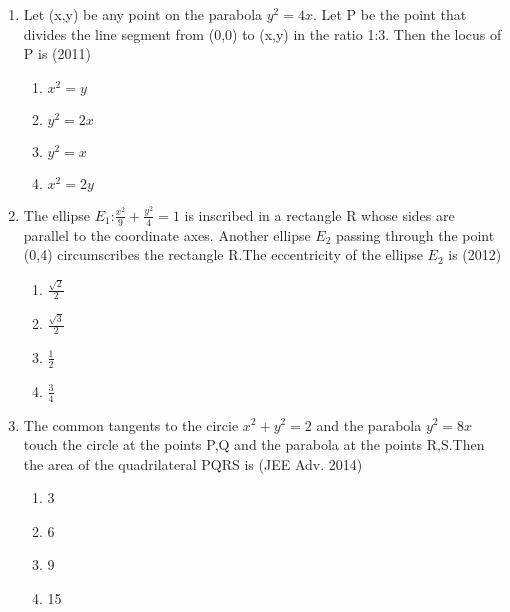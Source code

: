 \documentclass[journal,12pt,onecolumn]{IEEEtran}
\theoremstyle{remark}
\begin{document}
\begin{enumerate}
	\item Let (x,y) be any point on the parabola $y^2=4x$. Let P be the point that divides the line segment from (0,0) to (x,y) in the ratio 1:3. Then the locus of P is  \hfill(2011)\\
		\begin{enumerate}
			\item $x^2=y$
			\item $y^2=2x$
			\item $y^2=x$
			\item $x^2=2y$
		\end{enumerate}

	\item The ellipse $E_{1}$:$\frac{x^2}{9}+\frac{y^2}{4}=1$ is inscribed in a rectangle R whose sides are parallel to the coordinate axes. Another ellipse $E_{2}$ passing through the point (0,4) circumscribes the rectangle R.The eccentricity of the ellipse $E_{2}$ is \hfill(2012)\\

		\begin{enumerate}
			\item $\frac{\sqrt{2}}{2}$
			\item $\frac{\sqrt{3}}{2}$
			\item $\frac{1}{2}$
			\item $\frac{3}{4}$
		\end{enumerate}

	\item The common tangents to the circie $x^2+y^2=2$ and the parabola $y^2=8x$ touch the circle at the points P,Q and the parabola at the points R,S.Then the area of the quadrilateral PQRS is \hfill(JEE Adv. 2014)\\
		\begin{enumerate}
			\item 3
			\item 6
			\item 9
			\item 15
		\end{enumerate}
		\vspace{0.5cm}
\end{enumerate}
\end{document}
